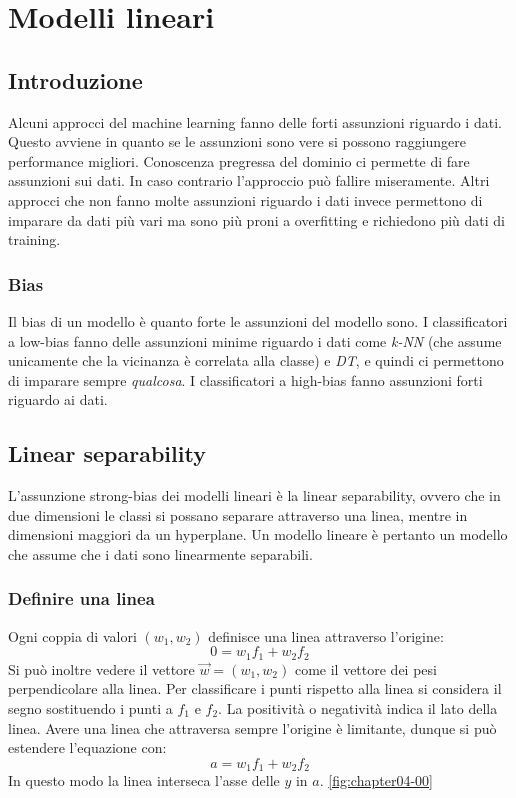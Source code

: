 \chapter{Modelli lineari}

\section{Introduzione}
Alcuni approcci del machine learning fanno delle forti assunzioni riguardo i dati.
Questo avviene in quanto se le assunzioni sono vere si possono raggiungere performance migliori. 
Conoscenza pregressa del dominio ci permette di fare assunzioni sui dati.
In caso contrario l'approccio pu\`o fallire miseramente.
Altri approcci che non fanno molte assunzioni riguardo i dati invece permettono di imparare da dati pi\`u vari ma sono pi\`u proni a overfitting e richiedono pi\`u dati di training.

	\subsection{Bias}
	Il bias di un modello \`e quanto forte le assunzioni del modello sono.
	I classificatori a low-bias fanno delle assunzioni minime riguardo i dati come \emph{k-NN} (che assume unicamente che la vicinanza \`e correlata alla classe) e \emph{DT}, e quindi ci permettono di imparare sempre \emph{qualcosa}.
	I classificatori a high-bias fanno assunzioni forti riguardo ai dati.
	
\section{Linear separability}
L'assunzione strong-bias dei modelli lineari \`e la linear separability, ovvero che in due dimensioni le classi si possano separare attraverso una linea, mentre in dimensioni maggiori da un hyperplane.
Un modello lineare \`e pertanto un modello che assume che i dati sono linearmente separabili. 
	
	\subsection{Definire una linea}
	Ogni coppia di valori $(w_1,w_2)$ definisce una linea attraverso l'origine:
	$$0=w_1f_1+w_2f_2$$
	Si pu\`o inoltre vedere il vettore $\overrightarrow{w}=(w_1, w_2)$ come il vettore dei pesi perpendicolare alla linea.
	Per classificare i punti rispetto alla linea si considera il segno sostituendo i punti a $f_1$ e $f_2$.
	La positivit\`a o negativit\`a indica il lato della linea.
	Avere una linea che attraversa sempre l'origine è limitante, dunque si pu\`o estendere l'equazione con:
	$$a=w_1f_1+w_2f_2$$
	In questo modo la linea interseca l'asse delle $y$ in $a$. \ref{fig:chapter04-00}
	
